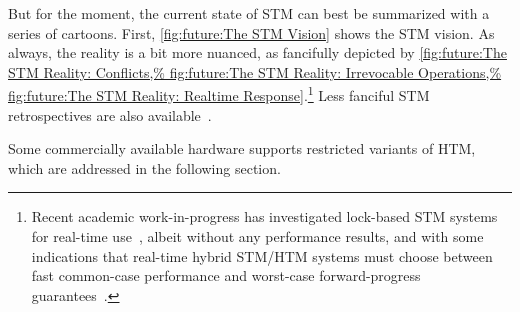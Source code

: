 But for the moment, the current state of STM
can best be summarized with a series of cartoons.
First,
\cref{fig:future:The STM Vision}
shows the STM vision.
As always, the reality is a bit more nuanced, as fancifully depicted by
\cref{fig:future:The STM Reality: Conflicts,%
fig:future:The STM Reality: Irrevocable Operations,%
fig:future:The STM Reality: Realtime Response}.\footnote{
	Recent academic work-in-progress has investigated lock-based STM
	systems for real-time use~\cite{JimAnderson2019STMRT,CatherineNemitz2018LockSTMrealtime},
	albeit without any performance results, and with some indications
	that real-time hybrid STM/HTM systems must choose between fast
	common-case performance and worst-case forward-progress
	guarantees~\cite{DBLP:journals/corr/AlistarhKKRS14,MartinSchoeberl2010realtimeTM}.}
Less fanciful STM retrospectives are also
available~\cite{JoeDuffy2010RetroTM,JoeDuffy2010RetroTM2}.

Some commercially available hardware supports restricted variants of
HTM, which are addressed in the following section.
